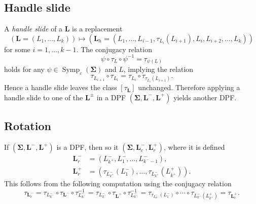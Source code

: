 \documentclass[11pt]{amsart}
\DeclareMathOperator{\Symp}{Symp}
\newcommand{\thicc}[1]{\pmb{#1}}
\newcommand{\LagTuple}{\thicc{L}}
\begin{document}
\subsection{Handle slide}

A \emph{handle slide} of a $\LagTuple$ is a replacement
\begin{equation*}
\left(\LagTuple = (L_{1}, \dots, L_{k})\right) \mapsto \left(\LagTuple_{h} = (L_{1}, \dots, L_{i-1}, \tau_{L_{i}}(L_{i+1}), L_{i}, L_{i+2}, \dots, L_{k})\right)
\end{equation*}
for some $i=1, \dots, k-1$. The conjugacy relation
\begin{equation}\label{Eq:Conjugacy}
\psi \circ \tau_{L} \circ \psi^{-1} = \tau_{\psi(L)}
\end{equation}
holds for any $\psi \in \Symp_{c}(\thicc{\Sigma})$ and $L$, implying the relation
\begin{equation*}
\tau_{L_{i+1}}\circ \tau_{L_{i}} = \tau_{L_{i}} \circ \tau_{\tau_{L_{i}}(L_{i+1})}.
\end{equation*}
Hence a handle slide leaves the class $[\tau_{\LagTuple}]$ unchanged. Therefore applying a handle slide to one of the $\LagTuple^{\pm}$ in a DPF $(\thicc{\Sigma}, \LagTuple^{-}, \LagTuple^{+})$ yields another DPF.

\subsection{Rotation}

If $(\thicc{\Sigma}, \LagTuple^{-}, \LagTuple^{+})$ is a DPF, then so it $(\thicc{\Sigma}, \LagTuple^{-}_{c}, \LagTuple^{+}_{r})$, where it is defined
\begin{equation*}
\begin{aligned}
\LagTuple_{r}^{-} &= (L^{-}_{k^{+}}, L^{-}_{1}, \dots, L^{-}_{k^{-}-1}),\\
\LagTuple_{r}^{+} &= (\tau_{L^{-}_{k^{+}}}(L^{-}_{1}), \dots, \tau_{L^{-}_{k^{+}}}(L^{+}_{k^{+}})).
\end{aligned}
\end{equation*}
This follows from the following computation using the conjugacy relation
\begin{equation*}
\tau_{\LagTuple_{c}^{-}} = \tau_{L^{-}_{k^{-}}} \circ \tau_{\LagTuple^{-}} \circ \tau_{L^{-}_{k^{-}}}^{-1} = \tau_{L^{-}_{k^{-}}} \circ \tau_{\LagTuple^{+}} \circ \tau_{L^{-}_{k^{-}}}^{-1} = \tau_{\tau_{L^{-}_{k^{-}}}(L^{-}_{1})}\circ \cdots \circ \tau_{L^{-}_{k^{-}}(L^{+}_{k^{+}})} = \tau_{\LagTuple_{c}^{+}}.
\end{equation*}
\end{document}
